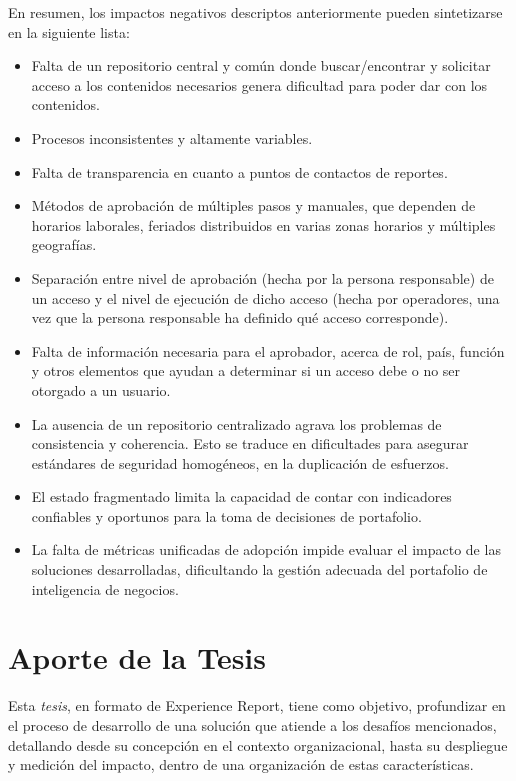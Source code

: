\newpage
En resumen, los impactos negativos descriptos anteriormente pueden sintetizarse en la siguiente lista: 

\begin{itemize}
\item Falta de un repositorio central y común donde buscar/encontrar y solicitar acceso a los contenidos necesarios genera dificultad para poder dar con los contenidos.
\item Procesos inconsistentes y altamente variables.
\item Falta de transparencia en cuanto a puntos de contactos de reportes.
\item Métodos de aprobación de múltiples pasos y manuales, que dependen de horarios laborales, feriados distribuidos en varias zonas horarios y múltiples geografías.
\item Separación entre nivel de aprobación (hecha por la persona responsable) de un acceso y el nivel de ejecución de dicho acceso (hecha por operadores, una vez que la persona responsable ha definido qué acceso corresponde).
\item Falta de información necesaria para el aprobador, acerca de rol, país, función y otros elementos que ayudan a determinar si un acceso debe o no ser otorgado a un usuario.
\item La ausencia de un repositorio centralizado agrava los problemas de consistencia y coherencia. Esto se traduce en dificultades para asegurar estándares de seguridad homogéneos, en la duplicación de esfuerzos.
\item El estado fragmentado limita la capacidad de contar con indicadores confiables y oportunos para la toma de decisiones de portafolio. 
\item La falta de métricas unificadas de adopción impide evaluar el impacto de las soluciones desarrolladas, dificultando la gestión adecuada del portafolio de inteligencia de negocios.
\end{itemize}


\section{Aporte de la Tesis}
Esta \textit{tesis}, en formato de Experience Report, tiene como objetivo, profundizar en el proceso de desarrollo de una solución que atiende a los desafíos mencionados, detallando desde su concepción en el contexto organizacional, hasta su despliegue y medición del impacto, dentro de una organización de estas características.

